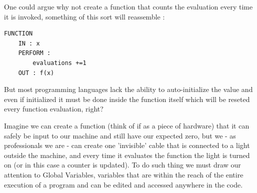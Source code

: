 



One could argue why not create a function that counts the evaluation every time it is invoked, something of this sort will reassemble : 
\begin{lstlisting}
FUNCTION 
    IN : x
    PERFORM : 
        evaluations +=1
    OUT : f(x)
\end{lstlisting}

But most programming languages lack the ability to auto-initialize the value and even if initialized it must be done inside the function itself which will be reseted every function evaluation, right?

Imagine we can create a function (think of if as a piece of hardware) that it can safely be input to our machine and still have our expected zero, but we - as professionals we are - can create one 'invisible' cable that is connected to a light outside the machine, and every time it evaluates the function the light is turned on (or in this case a counter is updated). To do such thing we must draw our attention to Global Variables, variables that are within the reach of the entire execution of a program and can be edited and accessed anywhere in the code. 

